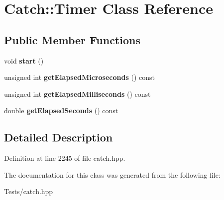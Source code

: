\hypertarget{class_catch_1_1_timer}{}\section{Catch\+:\+:Timer Class Reference}
\label{class_catch_1_1_timer}
\subsection*{Public Member Functions}
\begin{DoxyCompactItemize}
\item 
\mbox{\label{class_catch_1_1_timer_a0a56e879e43f36c102bf9ea8b5fc8b72}} 
void {\bfseries start} ()
\item 
\mbox{\label{class_catch_1_1_timer_af592ca4a9d340b9855732e4af777eaf0}} 
unsigned int {\bfseries get\+Elapsed\+Microseconds} () const
\item 
\mbox{\label{class_catch_1_1_timer_a2081b2d36950ab6912e7c4958afe0099}} 
unsigned int {\bfseries get\+Elapsed\+Milliseconds} () const
\item 
\mbox{\label{class_catch_1_1_timer_ae1615c8a9aa44b7a96cfe8a35d34e5de}} 
double {\bfseries get\+Elapsed\+Seconds} () const
\end{DoxyCompactItemize}


\subsection{Detailed Description}


Definition at line 2245 of file catch.\+hpp.



The documentation for this class was generated from the following file\+:\begin{DoxyCompactItemize}
\item 
Tests/catch.\+hpp\end{DoxyCompactItemize}
